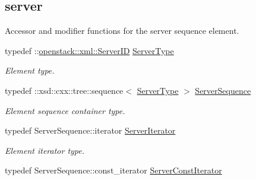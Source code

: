 \subsection*{server}
\label{_amgrpcf1e8c14e54505f60aa10ceb8d5d8ab3}
Accessor and modifier functions for the server sequence element. \begin{DoxyCompactItemize}
\item 
\hypertarget{classopenstack_1_1xml_1_1ServerIDList_aed57ef1dcc2f3bd2c7b56a0891e8faed}{
typedef ::\hyperlink{classopenstack_1_1xml_1_1ServerID}{openstack::xml::ServerID} \hyperlink{classopenstack_1_1xml_1_1ServerIDList_aed57ef1dcc2f3bd2c7b56a0891e8faed}{ServerType}}
\label{classopenstack_1_1xml_1_1ServerIDList_aed57ef1dcc2f3bd2c7b56a0891e8faed}

\begin{DoxyCompactList}\small\item\em Element type. \item\end{DoxyCompactList}\item 
\hypertarget{classopenstack_1_1xml_1_1ServerIDList_a76966a1d164f92e19cbe3c2c573475e2}{
typedef ::xsd::cxx::tree::sequence$<$ \hyperlink{classopenstack_1_1xml_1_1ServerID}{ServerType} $>$ \hyperlink{classopenstack_1_1xml_1_1ServerIDList_a76966a1d164f92e19cbe3c2c573475e2}{ServerSequence}}
\label{classopenstack_1_1xml_1_1ServerIDList_a76966a1d164f92e19cbe3c2c573475e2}

\begin{DoxyCompactList}\small\item\em Element sequence container type. \item\end{DoxyCompactList}\item 
\hypertarget{classopenstack_1_1xml_1_1ServerIDList_aecb191cae2bcf67e9e6b276b427bea00}{
typedef ServerSequence::iterator \hyperlink{classopenstack_1_1xml_1_1ServerIDList_aecb191cae2bcf67e9e6b276b427bea00}{ServerIterator}}
\label{classopenstack_1_1xml_1_1ServerIDList_aecb191cae2bcf67e9e6b276b427bea00}

\begin{DoxyCompactList}\small\item\em Element iterator type. \item\end{DoxyCompactList}\item 
\hypertarget{classopenstack_1_1xml_1_1ServerIDList_a5fcb6725b4f36e6d28eafdd76901180b}{
typedef ServerSequence::const\_\-iterator \hyperlink{classopenstack_1_1xml_1_1ServerIDList_a5fcb6725b4f36e6d28eafdd76901180b}{ServerConstIterator}}
\label{classopenstack_1_1xml_1_1ServerIDList_a5fcb6725b4f36e6d28eafdd76901180b}


\end{DoxyCompactItemize}
